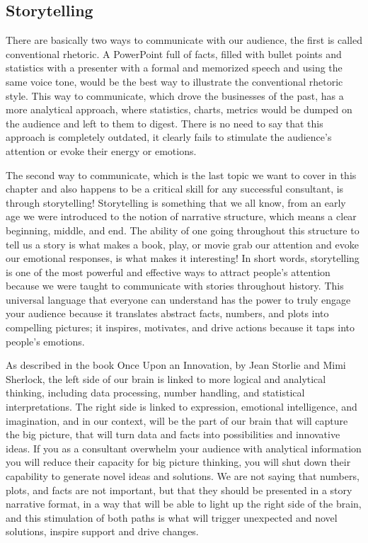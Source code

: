 \documentclass[
]{book}
\begin{document}
\hypertarget{storytelling}{%
\subsection{Storytelling}\label{storytelling}}

There are basically two ways to communicate with our audience, the first is called conventional rhetoric. A PowerPoint full of facts, filled with bullet points and statistics with a presenter with a formal and memorized speech and using the same voice tone, would be the best way to illustrate the conventional rhetoric style. This way to communicate, which drove the businesses of the past, has a more analytical approach, where statistics, charts, metrics would be dumped on the audience and left to them to digest. There is no need to say that this approach is completely outdated, it clearly fails to stimulate the audience's attention or evoke their energy or emotions.

The second way to communicate, which is the last topic we want to cover in this chapter and also happens to be a critical skill for any successful consultant, is through storytelling! Storytelling is something that we all know, from an early age we were introduced to the notion of narrative structure, which means a clear beginning, middle, and end. The ability of one going throughout this structure to tell us a story is what makes a book, play, or movie grab our attention and evoke our emotional responses, is what makes it interesting! In short words, storytelling is one of the most powerful and effective ways to attract people's attention because we were taught to communicate with stories throughout history. This universal language that everyone can understand has the power to truly engage your audience because it translates abstract facts, numbers, and plots into compelling pictures; it inspires, motivates, and drive actions because it taps into people's emotions.

As described in the book Once Upon an Innovation, by Jean Storlie and Mimi Sherlock, the left side of our brain is linked to more logical and analytical thinking, including data processing, number handling, and statistical interpretations. The right side is linked to expression, emotional intelligence, and imagination, and in our context, will be the part of our brain that will capture the big picture, that will turn data and facts into possibilities and innovative ideas. If you as a consultant overwhelm your audience with analytical information you will reduce their capacity for big picture thinking, you will shut down their capability to generate novel ideas and solutions. We are not saying that numbers, plots, and facts are not important, but that they should be presented in a story narrative format, in a way that will be able to light up the right side of the brain, and this stimulation of both paths is what will trigger unexpected and novel solutions, inspire support and drive changes.
\end{document}
